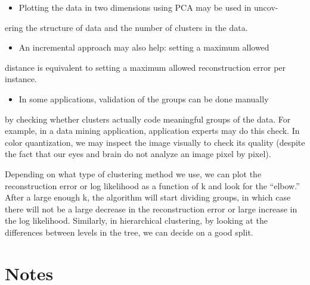 \begin{itemize}
\item Plotting the data in two dimensions using PCA may be used in uncov-
\end{itemize}

ering the structure of data and the number of clusters in the data.

\begin{itemize}
\item An incremental approach may also help: setting a maximum allowed
\end{itemize}

distance is equivalent to setting a maximum allowed reconstruction error per instance.

\begin{itemize}
\item In some applications, validation of the groups can be done manually
\end{itemize}

by checking whether clusters actually code meaningful groups of the data. For example, in a data mining application, application experts may do this check. In color quantization, we may inspect the image visually to check its quality (despite the fact that our eyes and brain do not analyze an image pixel by pixel).

Depending on what type of clustering method we use, we can plot the reconstruction error or log likelihood as a function of k and look for the “elbow.” After a large enough k, the algorithm will start dividing groups, in which case there will not be a large decrease in the reconstruction error or large increase in the log likelihood. Similarly, in hierarchical clustering, by looking at the differences between levels in the tree, we can decide on a good split.

\section{Notes}

